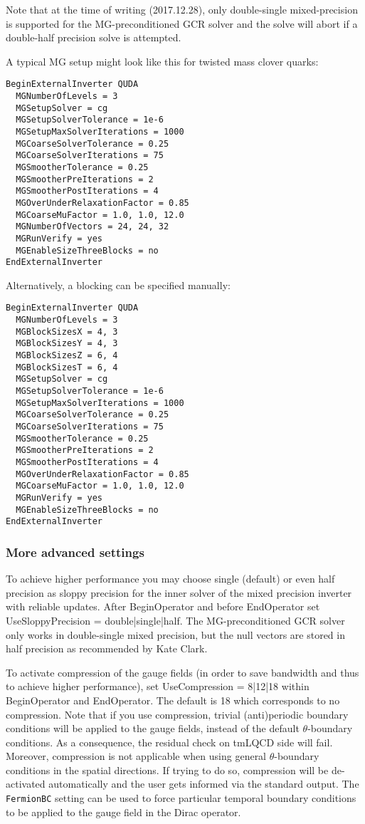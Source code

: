 Note that at the time of writing (2017.12.28), only double-single mixed-precision is supported for the MG-preconditioned GCR solver and the solve will abort if a double-half precision solve is attempted.

A typical MG setup might look like this for twisted mass clover quarks: 

\begin{verbatim}
BeginExternalInverter QUDA
  MGNumberOfLevels = 3
  MGSetupSolver = cg
  MGSetupSolverTolerance = 1e-6
  MGSetupMaxSolverIterations = 1000
  MGCoarseSolverTolerance = 0.25
  MGCoarseSolverIterations = 75
  MGSmootherTolerance = 0.25
  MGSmootherPreIterations = 2
  MGSmootherPostIterations = 4
  MGOverUnderRelaxationFactor = 0.85
  MGCoarseMuFactor = 1.0, 1.0, 12.0
  MGNumberOfVectors = 24, 24, 32
  MGRunVerify = yes
  MGEnableSizeThreeBlocks = no
EndExternalInverter
\end{verbatim}

Alternatively, a blocking can be specified manually:

\begin{verbatim}
BeginExternalInverter QUDA
  MGNumberOfLevels = 3
  MGBlockSizesX = 4, 3
  MGBlockSizesY = 4, 3
  MGBlockSizesZ = 6, 4
  MGBlockSizesT = 6, 4
  MGSetupSolver = cg
  MGSetupSolverTolerance = 1e-6
  MGSetupMaxSolverIterations = 1000
  MGCoarseSolverTolerance = 0.25
  MGCoarseSolverIterations = 75
  MGSmootherTolerance = 0.25
  MGSmootherPreIterations = 2
  MGSmootherPostIterations = 4
  MGOverUnderRelaxationFactor = 0.85
  MGCoarseMuFactor = 1.0, 1.0, 12.0
  MGRunVerify = yes
  MGEnableSizeThreeBlocks = no
EndExternalInverter
\end{verbatim}

\subsubsection{More advanced settings}
To achieve higher performance you may choose single (default) or even half precision as sloppy precision for the inner solver of the mixed precision inverter with reliable updates. After {\ttfamily BeginOperator} and before {\ttfamily EndOperator} set {\ttfamily UseSloppyPrecision = double|single|half}.
The MG-preconditioned GCR solver only works in double-single mixed precision, but the null vectors are stored in half precision as recommended by Kate Clark.

To activate compression of the gauge fields (in order to save bandwidth and thus to achieve higher performance), set {\ttfamily UseCompression = 8|12|18} within {\ttfamily BeginOperator} and {\ttfamily EndOperator}. 
The default is 18 which corresponds to no compression. 
Note that if you use compression, trivial (anti)periodic boundary conditions will be applied to the gauge fields, instead of the default $\theta$-boundary conditions. 
As a consequence, the residual check on tmLQCD side will fail. 
Moreover, compression is not applicable when using general $\theta$-boundary conditions in the spatial directions. 
If trying to do so, compression will be de-activated automatically and the user gets informed via the standard output.
The \texttt{FermionBC} setting can be used to force particular temporal boundary conditions to be applied to the gauge field in the Dirac operator.

